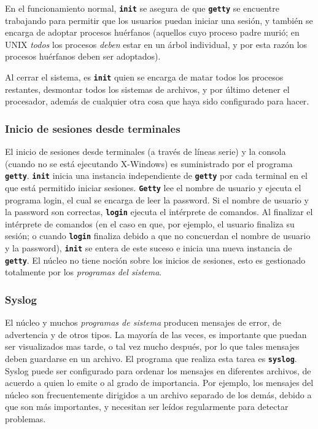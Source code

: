 \documentclass[12pt]{article}
\begin{document}
 En el funcionamiento normal, \texttt{\textbf{init}} se asegura de que
\texttt{\textbf{getty}} se encuentre trabajando para permitir que los usuarios puedan iniciar una
sesión, y también se encarga de adoptar procesos huérfanos (aquellos cuyo
proceso padre murió; en UNIX \textit{todos} los procesos \textit{deben} estar
en un árbol individual, y por esta razón los procesos huérfanos deben ser
adoptados).  

 Al cerrar el sistema, es \texttt{\textbf{init}} quien se encarga de
matar todos los procesos restantes, desmontar todos los sistemas de archivos, y
por último detener el procesador, además de cualquier otra cosa que haya sido
configurado para hacer.  



\subsubsection{Inicio de sesiones desde terminales}

 El inicio de sesiones desde terminales (a través de líneas serie) y la
consola (cuando no se está ejecutando X-Windows) es suministrado por el programa
\texttt{\textbf{getty}}. \texttt{\textbf{init}} inicia una instancia
independiente de \texttt{\textbf{getty}} por cada terminal en el que está permitido iniciar
sesiones. \texttt{\textbf{Getty}} lee el nombre de usuario y ejecuta el
programa login, el cual se encarga de leer la password. Si el nombre de usuario
y la password son correctas, \texttt{\textbf{login}} ejecuta el intérprete de
comandos.  Al finalizar el intérprete de comandos (en el caso en que, por
ejemplo, el usuario finaliza su sesión; o cuando \texttt{\textbf{login}} finaliza debido a que no
concuerdan el nombre de usuario y la password), \texttt{\textbf{init}} se
entera de este suceso e inicia una nueva instancia de \texttt{\textbf{getty}}.
El núcleo no tiene noción sobre los inicios de sesiones, esto es gestionado
totalmente por los \textit{programas del sistema}.  


\subsubsection{Syslog}

 El núcleo y muchos \textit{programas de sistema} producen
mensajes de error, de advertencia y de otros tipos. La mayoría de las veces, es
importante que puedan ser visualizados mas tarde, o tal vez mucho después, por
lo que tales mensajes deben guardarse en un archivo. El programa que realiza
esta tarea es \texttt{\textbf{syslog}}. Syslog puede ser configurado para
ordenar los mensajes en diferentes archivos, de acuerdo a quien lo emite o al
grado de importancia.  Por ejemplo, los mensajes del núcleo son frecuentemente
dirigidos a un archivo separado de los demás, debido a que son más importantes,
y necesitan ser leídos regularmente para detectar problemas.  
\end{document}

